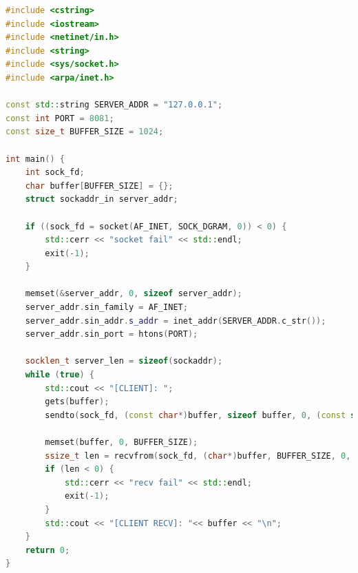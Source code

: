 \begin{lstlisting}[language=C++, caption={udp client code}]
#include <cstring>
#include <iostream>
#include <netinet/in.h>
#include <string>
#include <sys/socket.h>
#include <arpa/inet.h>

const std::string SERVER_ADDR = "127.0.0.1";
const int PORT = 8081;
const size_t BUFFER_SIZE = 1024;

int main() {
    int sock_fd;
    char buffer[BUFFER_SIZE] = {};
    struct sockaddr_in server_addr;

    if ((sock_fd = socket(AF_INET, SOCK_DGRAM, 0)) < 0) {
        std::cerr << "socket fail" << std::endl;
        exit(-1);
    }

    memset(&server_addr, 0, sizeof server_addr);
    server_addr.sin_family = AF_INET;
    server_addr.sin_addr.s_addr = inet_addr(SERVER_ADDR.c_str());
    server_addr.sin_port = htons(PORT);

    socklen_t server_len = sizeof(sockaddr);
    while (true) {
        std::cout << "[CLIENT]: ";
        gets(buffer);
        sendto(sock_fd, (const char*)buffer, sizeof buffer, 0, (const struct sockaddr*)&server_addr, server_len);

        memset(buffer, 0, BUFFER_SIZE);
        ssize_t len = recvfrom(sock_fd, (char*)buffer, BUFFER_SIZE, 0, (struct sockaddr*)&server_addr, &server_len);
        if (len < 0) {
            std::cerr << "recv fail" << std::endl;
            exit(-1);
        }
        std::cout << "[CLIENT RECV]: "<< buffer << "\n";
    }
    return 0;
}
\end{lstlisting}

